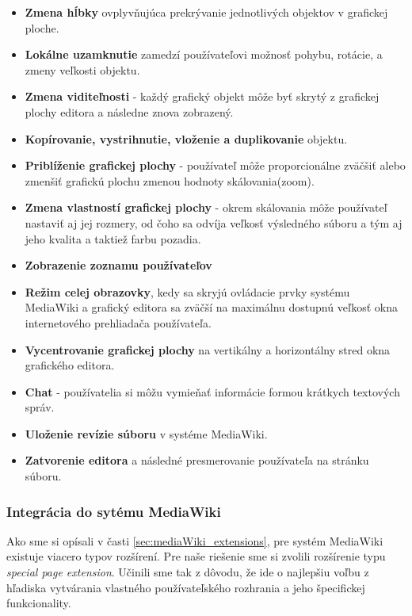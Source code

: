 \begin{itemize}
	\item \textbf{Zmena hĺbky} ovplyvňujúca prekrývanie jednotlivých objektov v grafickej ploche.
	
	\item \textbf{Lokálne uzamknutie} zamedzí používateľovi možnosť pohybu, rotácie, a zmeny veľkosti objektu.
	
	\item \textbf{Zmena viditeľnosti} - každý grafický objekt môže byť skrytý z grafickej plochy editora a následne znova zobrazený.
	
	\item \textbf{Kopírovanie, vystrihnutie, vloženie a duplikovanie} objektu.
	
	\item \textbf{Priblíženie grafickej plochy} - používateľ môže proporcionálne zväčšiť alebo zmenšiť grafickú plochu zmenou hodnoty skálovania(zoom).
	
	\item \textbf{Zmena vlastností grafickej plochy} - okrem skálovania môže používateľ nastaviť aj jej rozmery, od čoho sa odvíja veľkosť výsledného súboru a tým aj jeho kvalita a taktiež farbu pozadia. 
	
	\item \textbf{Zobrazenie zoznamu používateľov}
	
	\item \textbf{Režim celej obrazovky}, kedy sa skryjú ovládacie prvky systému MediaWiki a grafický editora sa zväčší na maximálnu dostupnú veľkosť okna internetového prehliadača používateľa.
	
	\item \textbf{Vycentrovanie grafickej plochy} na vertikálny a horizontálny stred okna grafického editora.
	
	\item \textbf{Chat} - používatelia si môžu vymieňať informácie formou krátkych textových správ. 
	
	\item \textbf{Uloženie revízie súboru} v systéme MediaWiki. 
	
	\item \textbf{Zatvorenie editora} a následné presmerovanie používateľa na stránku súboru.
\end{itemize}

\subsubsection{Integrácia do sytému MediaWiki}
Ako sme si opísali v časti \ref{sec:mediaWiki_extensions}, pre systém MediaWiki existuje viacero typov rozšírení. Pre naše riešenie sme si zvolili rozšírenie typu \textit{special page extension}. Učinili sme tak z dôvodu, že ide o najlepšiu voľbu z hľadiska vytvárania vlastného používateľského rozhrania a jeho špecifickej funkcionality. 


